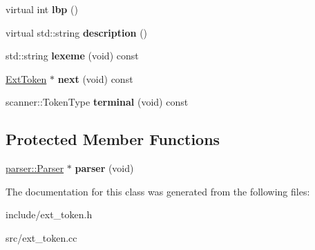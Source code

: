 \begin{DoxyCompactItemize}
\item 
virtual int {\bfseries lbp} ()\hypertarget{classfcal_1_1scanner_1_1ExtToken_adecef3770f08e5a26f103ab62171cc91}{}\label{classfcal_1_1scanner_1_1ExtToken_adecef3770f08e5a26f103ab62171cc91}

\item 
virtual std\+::string {\bfseries description} ()\hypertarget{classfcal_1_1scanner_1_1ExtToken_a29a72149492d7fef7968a1b894d334c7}{}\label{classfcal_1_1scanner_1_1ExtToken_a29a72149492d7fef7968a1b894d334c7}

\item 
std\+::string {\bfseries lexeme} (void) const \hypertarget{classfcal_1_1scanner_1_1ExtToken_a32d06bece581a1711625c3a503db21e1}{}\label{classfcal_1_1scanner_1_1ExtToken_a32d06bece581a1711625c3a503db21e1}

\item 
\hyperlink{classfcal_1_1scanner_1_1ExtToken}{Ext\+Token} $\ast$ {\bfseries next} (void) const \hypertarget{classfcal_1_1scanner_1_1ExtToken_aa927cdbdee70b7e74e0aee075f340472}{}\label{classfcal_1_1scanner_1_1ExtToken_aa927cdbdee70b7e74e0aee075f340472}

\item 
scanner\+::\+Token\+Type {\bfseries terminal} (void) const \hypertarget{classfcal_1_1scanner_1_1ExtToken_a0bc057f41ebfeab0900a467af3798bbf}{}\label{classfcal_1_1scanner_1_1ExtToken_a0bc057f41ebfeab0900a467af3798bbf}

\end{DoxyCompactItemize}
\subsection*{Protected Member Functions}
\begin{DoxyCompactItemize}
\item 
\hyperlink{classfcal_1_1parser_1_1Parser}{parser\+::\+Parser} $\ast$ {\bfseries parser} (void)\hypertarget{classfcal_1_1scanner_1_1ExtToken_a311bc29b9732fc7825012ecf08d1d73f}{}\label{classfcal_1_1scanner_1_1ExtToken_a311bc29b9732fc7825012ecf08d1d73f}

\end{DoxyCompactItemize}


The documentation for this class was generated from the following files\+:\begin{DoxyCompactItemize}
\item 
include/ext\+\_\+token.\+h\item 
src/ext\+\_\+token.\+cc\end{DoxyCompactItemize}
